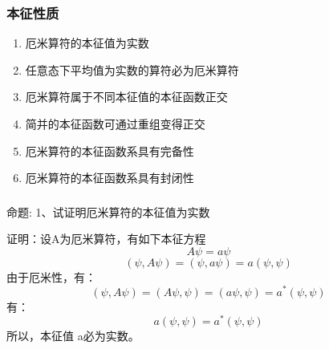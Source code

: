 \begin{frame}
    \frametitle{本征性质}
    \begin{enumerate}
        \item 厄米算符的本征值为实数
        \item 任意态下平均值为实数的算符必为厄米算符
        \item 厄米算符属于不同本征值的本征函数正交
        \item 简并的本征函数可通过重组变得正交
        \item 厄米算符的本征函数系具有完备性
        \item 厄米算符的本征函数系具有封闭性
    \end{enumerate}
\end{frame} 
\begin{frame} [allowframebreaks=]
    \frametitle{}
    \begin{tcolorbox1}{命题:}
        1、试证明厄米算符的本征值为实数
    \end{tcolorbox1}
    \alert{证明：}设A为厄米算符，有如下本征方程
    $$A\psi=a\psi $$
    \begin{equation*}
        (\psi, A\psi)=(\psi, a\psi)=a(\psi, \psi)
    \end{equation*}  
    由于厄米性，有：
    \begin{equation*}
        (\psi, A\psi)=(A\psi, \psi)=(a\psi, \psi)= a^* (\psi, \psi)
    \end{equation*}
    有：
    \begin{equation*}
        a(\psi, \psi)= a^* (\psi, \psi)
    \end{equation*}
    所以，本征值 a必为实数。
\end{frame} 

